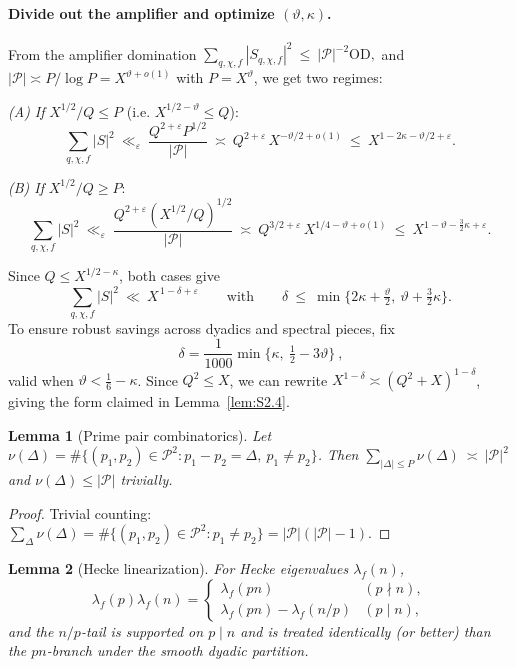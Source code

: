 \documentclass[11pt]{article}
\newtheorem{lemma}{Lemma}[section]
\theoremstyle{definition}
\theoremstyle{remark}
\begin{document}
\paragraph{Divide out the amplifier and optimize $(\vartheta,\kappa)$.}
From the amplifier domination
\(
\sum_{q,\chi,f}|S_{q,\chi,f}|^2\ \le\ |\mathcal P|^{-2}\mathrm{OD},
\)
and $|\mathcal P|\asymp P/\log P=X^{\vartheta+o(1)}$ with $P=X^\vartheta$, we get two regimes:

\smallskip
\noindent\emph{(A) If } $X^{1/2}/Q\le P$ (i.e. $X^{1/2-\vartheta}\le Q$):
\[
	\sum_{q,\chi,f}|S|^2\ \ll_\varepsilon\ \frac{Q^{2+\varepsilon}P^{1/2}}{|\mathcal P|}\ \asymp\ Q^{2+\varepsilon}\,X^{-\vartheta/2+o(1)}
	\ \le\ X^{1-2\kappa-\vartheta/2+\varepsilon}.
\]

\noindent\emph{(B) If } $X^{1/2}/Q\ge P$:
\[
	\sum_{q,\chi,f}|S|^2\ \ll_\varepsilon\ \frac{Q^{2+\varepsilon}(X^{1/2}/Q)^{1/2}}{|\mathcal P|}
	\ \asymp\ Q^{3/2+\varepsilon}\,X^{1/4-\vartheta+o(1)}
	\ \le\ X^{1-\vartheta-\tfrac{3}{2}\kappa+\varepsilon}.
\]

Since $Q\le X^{1/2-\kappa}$, both cases give
\[
	\sum_{q,\chi,f}|S|^2\ \ll\ X^{\,1-\delta+\varepsilon}
	\qquad\text{with}\qquad
	\delta\ \le\ \min\Big\{2\kappa+\tfrac{\vartheta}{2},\ \vartheta+\tfrac{3}{2}\kappa\Big\}.
\]
To ensure robust savings across dyadics and spectral pieces, fix
\[
	\boxed{\ \delta=\frac{1}{1000}\min\!\Big\{\kappa,\ \tfrac12-3\vartheta\Big\}\ },
\]
valid when $\vartheta<\tfrac16-\kappa$. Since $Q^2\le X$, we can rewrite $X^{1-\delta}\asymp(Q^2+X)^{1-\delta}$, giving the form claimed in Lemma~\ref{lem:S2.4}.


\begin{lemma}[Prime pair combinatorics]\label{lem:prime-pair}
	Let $\nu(\Delta)=\#\{(p_1,p_2)\in\mathcal P^2: p_1-p_2=\Delta,\ p_1\ne p_2\}$. Then
	\(
	\sum_{|\Delta|\le P}\nu(\Delta)\ \asymp\ |\mathcal P|^2
	\)
	and $\nu(\Delta)\le |\mathcal P|$ trivially.
\end{lemma}

\begin{proof}
	Trivial counting: $\sum_{\Delta}\nu(\Delta)=\#\{(p_1,p_2)\in\mathcal P^2: p_1\ne p_2\}=|\mathcal P|(|\mathcal P|-1)$.
\end{proof}

\begin{lemma}[Hecke linearization]\label{lem:hecke-linearization}
	For Hecke eigenvalues $\lambda_f(n)$,
	\[
		\lambda_f(p)\lambda_f(n)=
		\begin{cases}
			\lambda_f(pn)                & (p\nmid n), \\
			\lambda_f(pn)-\lambda_f(n/p) & (p\mid n),
		\end{cases}
	\]
	and the $n/p$-tail is supported on $p\mid n$ and is treated identically (or better) than the $pn$-branch under the smooth dyadic partition.
\end{lemma}
\end{document}
